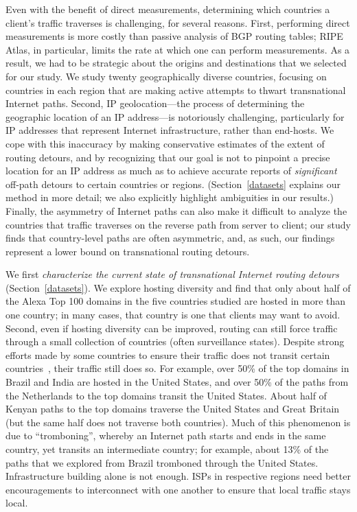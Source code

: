 Even with the benefit of direct measurements, determining which countries a
client's traffic traverses is challenging, for several reasons.  First,
performing direct measurements is more costly than passive analysis of BGP
routing tables; RIPE Atlas, in particular, limits the rate at which one can
perform measurements.  As a result, we had to be strategic about the origins
and destinations that we selected for our study. We study twenty
geographically diverse countries,  focusing on countries in each region that
are making active attempts to thwart transnational Internet paths.  Second, IP
geolocation---the process of determining the geographic location of an IP
address---is notoriously challenging, particularly for IP addresses that
represent Internet infrastructure, rather than end-hosts. We cope with this
inaccuracy by making conservative estimates of the extent of routing detours,
and by recognizing that our goal is not to pinpoint a precise location for an
IP address as much as to achieve accurate reports of {\em significant} off-path 
detours to certain countries or regions. (Section~\ref{datasets} explains
our method in more detail; we also explicitly highlight ambiguities in our
results.) Finally, the asymmetry of Internet paths can also make it difficult
to analyze the countries that traffic traverses on the reverse path from
server to client; our study finds that country-level paths are often
asymmetric, and, as such, our findings represent a lower bound on
transnational routing detours.

We first {\em characterize the current state of transnational Internet
routing detours} (Section~\ref{datasets}).  We explore hosting diversity
and find that only about half of the Alexa Top 100 domains in the five
countries studied are hosted in more than one country; in many cases,
that country is one that clients may want to avoid. Second, even if
hosting diversity can be improved, routing can still force traffic
through a small collection of countries (often surveillance
states). Despite strong efforts made by some countries to ensure their
traffic does not transit certain countries~\cite{brazil_history,
  brazil_break_from_US, brazil_conference, brazil_conference2,
  brazil_human_rights}, their traffic still does so.  For example, over 50\% of the
top domains in Brazil and India are hosted in the United States, and
over 50\% of the paths from the Netherlands to the top domains transit
the United States.  About half of Kenyan paths to the top domains
traverse the United States and Great Britain (but the same half does not
traverse both countries).  Much of this phenomenon is due to
``tromboning'', whereby an Internet path starts and ends in the same country,
yet transits an intermediate country; for example, about 13\% of the
paths that we explored from Brazil tromboned through the United States.
Infrastructure building alone is not enough. ISPs in respective regions
need better encouragements to interconnect with one another to ensure
that local traffic stays local.

